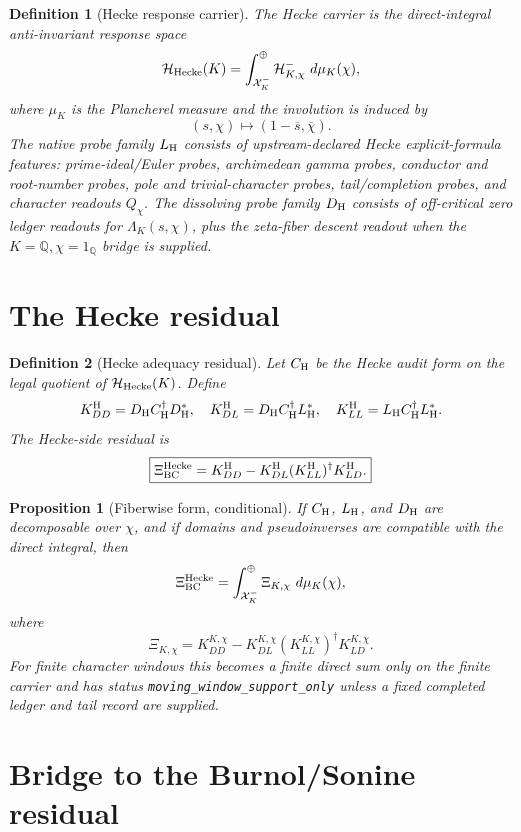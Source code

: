 \documentclass[11pt]{article}
\newtheorem{definition}{Definition}
\newtheorem{proposition}{Proposition}
\newcommand{\Q}{\mathbb Q}
\newcommand{\Hh}{\mathcal H_{\rm Hecke}}
\newcommand{\X}{\mathcal X}
\newcommand{\XiH}{\Xi_{\rm BC}^{\rm Hecke}}
\newcommand{\dd}{\,d}
\begin{document}
\begin{definition}[Hecke response carrier]
The Hecke carrier is the direct-integral anti-invariant response space
\[
  \Hh(K)=
  \int_{\X_K^-}^{\oplus}\mathcal H_{K,\chi}^{-}\,\dd\mu_K(\chi),
\]
where \(\mu_K\) is the Plancherel measure and the involution is induced by
\[
  (s,\chi)\mapsto (1-\overline{s},\overline{\chi}).
\]
The native probe family \(L_{\rm H}\) consists of upstream-declared Hecke explicit-formula features: prime-ideal/Euler probes, archimedean gamma probes, conductor and root-number probes, pole and trivial-character probes, tail/completion probes, and character readouts \(Q_\chi\).  The dissolving probe family \(D_{\rm H}\) consists of off-critical zero ledger readouts for \(\Lambda_K(s,\chi)\), plus the zeta-fiber descent readout when the \(K=\Q,\chi=1_\Q\) bridge is supplied.
\end{definition}

\section{The Hecke residual}

\begin{definition}[Hecke adequacy residual]
Let \(C_{\rm H}\) be the Hecke audit form on the legal quotient of \(\Hh(K)\).  Define
\[
  K^{\rm H}_{DD}=D_{\rm H}C_{\rm H}^{\dagger}D_{\rm H}^*,\quad
  K^{\rm H}_{DL}=D_{\rm H}C_{\rm H}^{\dagger}L_{\rm H}^*,\quad
  K^{\rm H}_{LL}=L_{\rm H}C_{\rm H}^{\dagger}L_{\rm H}^*.
\]
The Hecke-side residual is
\[
  \boxed{
  \XiH
  =
  K^{\rm H}_{DD}
  -
  K^{\rm H}_{DL}(K^{\rm H}_{LL})^\dagger K^{\rm H}_{LD}.
  }
\]
\end{definition}

\begin{proposition}[Fiberwise form, conditional]
If \(C_{\rm H}\), \(L_{\rm H}\), and \(D_{\rm H}\) are decomposable over \(\chi\), and if domains and pseudoinverses are compatible with the direct integral, then
\[
  \XiH
  =
  \int_{\X_K^-}^{\oplus}
  \Xi_{K,\chi}\,\dd\mu_K(\chi),
\]
where
\[
  \Xi_{K,\chi}
  =
  K_{DD}^{K,\chi}
  -
  K_{DL}^{K,\chi}(K_{LL}^{K,\chi})^\dagger K_{LD}^{K,\chi}.
\]
For finite character windows this becomes a finite direct sum only on the finite carrier and has status \texttt{moving\_window\_support\_only} unless a fixed completed ledger and tail record are supplied.
\end{proposition}

\section{Bridge to the Burnol/Sonine residual}
\end{document}
